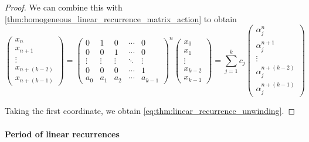 \begin{proof}
  We can combine this with \cref{thm:homogeneous_linear_recurrence_matrix_action} to obtain
  \begin{equation*}
    \begin{pmatrix}
      x_n         \\
      x_{n+1}     \\
      \vdots      \\
      x_{n+(k-2)} \\
      x_{n+(k-1)}
    \end{pmatrix}
    =
    \begin{pmatrix}
      0      & 1      & 0      & \cdots & 0      \\
      0      & 0      & 1      & \cdots & 0      \\
      \vdots & \vdots & \vdots & \ddots & \vdots \\
      0      & 0      & 0      & \cdots & 1      \\
      a_0    & a_1    & a_2    & \cdots & a_{k-1}
    \end{pmatrix}^n
    \begin{pmatrix}
      x_0     \\
      x_1     \\
      \vdots  \\
      x_{k-2} \\
      x_{k-1}
    \end{pmatrix}
    =
    \sum_{j=1}^k c_j
    \begin{pmatrix}
      \alpha_j^n         \\
      \alpha_j^{n+1}     \\
      \vdots             \\
      \alpha_j^{n+(k-2)} \\
      \alpha_j^{n+(k-1)}
    \end{pmatrix}
  \end{equation*}

  Taking the first coordinate, we obtain \eqref{eq:thm:linear_recurrence_unwinding}.
\end{proof}

\paragraph{Period of linear recurrences}

